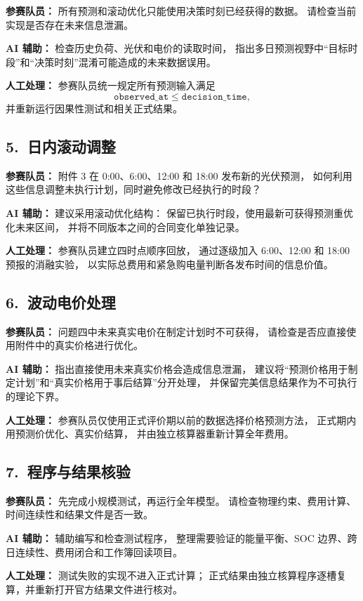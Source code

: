 \documentclass[zihao=-4,a4paper]{ctexart}
\begin{document}
\textbf{参赛队员：}
所有预测和滚动优化只能使用决策时刻已经获得的数据。
请检查当前实现是否存在未来信息泄漏。

\textbf{AI 辅助：}
检查历史负荷、光伏和电价的读取时间，
指出多日预测视野中“目标时段”和“决策时刻”混淆可能造成的未来数据误用。

\textbf{人工处理：}
参赛队员统一规定所有预测输入满足
\[
\texttt{observed\_at} \leq \texttt{decision\_time},
\]
并重新运行因果性测试和相关正式结果。

\subsection*{5.\ 日内滚动调整}

\textbf{参赛队员：}
附件 3 在 0:00、6:00、12:00 和 18:00 发布新的光伏预测，
如何利用这些信息调整未执行计划，同时避免修改已经执行的时段？

\textbf{AI 辅助：}
建议采用滚动优化结构：
保留已执行时段，使用最新可获得预测重优化未来区间，
并将不同版本之间的合同变化单独记录。

\textbf{人工处理：}
参赛队员建立四时点顺序回放，
通过逐级加入 6:00、12:00 和 18:00 预报的消融实验，
以实际总费用和紧急购电量判断各发布时间的信息价值。

\subsection*{6.\ 波动电价处理}

\textbf{参赛队员：}
问题四中未来真实电价在制定计划时不可获得，
请检查是否应直接使用附件中的真实价格进行优化。

\textbf{AI 辅助：}
指出直接使用未来真实价格会造成信息泄漏，
建议将“预测价格用于制定计划”和“真实价格用于事后结算”分开处理，
并保留完美信息结果作为不可执行的理论下界。

\textbf{人工处理：}
参赛队员仅使用正式评价期以前的数据选择价格预测方法，
正式期内用预测价优化、真实价结算，
并由独立核算器重新计算全年费用。

\subsection*{7.\ 程序与结果核验}

\textbf{参赛队员：}
先完成小规模测试，再运行全年模型。
请检查物理约束、费用计算、时间连续性和结果文件是否一致。

\textbf{AI 辅助：}
辅助编写和检查测试程序，
整理需要验证的能量平衡、SOC 边界、跨日连续性、费用闭合和工作簿回读项目。

\textbf{人工处理：}
测试失败的实现不进入正式计算；
正式结果由独立核算程序逐槽复算，并重新打开官方结果文件进行核对。
\end{document}
